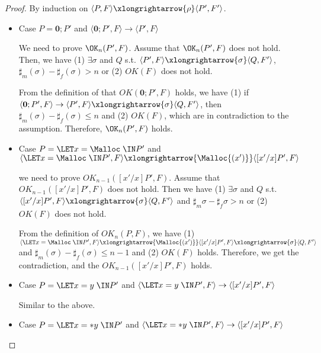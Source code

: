 \begin{proof}
By induction on \(\langle P, F \rangle \xlongrightarrow{\rho} \langle P', F' \rangle \).

\begin{itemize}

\item Case \(P = \mathbf{0};P'\) and \( \langle \mathbf{0};P', F \rangle \rightarrow \langle P', F \rangle\)

  We need to prove \(\OK_n(P', F)\).  Assume that \(\OK_n(P', F)\)
  does not hold. Then, we have (1) \( \exists \sigma \) and \(Q\) s.t. \(
  \langle P', F \rangle \xlongrightarrow{\sigma} \langle Q, F' \rangle
  \), \(\sharp_{m}(\sigma) - \sharp_{f}(\sigma) > n\) or (2) \(
  OK(F)\) does not hold.

  From the definition of that \(OK(\mathbf{0};P', F)\) holds, we have (1)
  if \( \langle \mathbf{0};P', F \rangle \rightarrow \langle P', F
  \rangle \xlongrightarrow{\sigma} \langle Q, F' \rangle \), then
  \(\sharp_m(\sigma) - \sharp_f(\sigma) \le n \) and (2) \(OK(F)\),
  which are in contradiction to the assumption. Therefore, \(\OK_n(P',
  F)\) holds.

\item Case \(P = \LET x = \Malloc \; \IN P'\) and \( \langle \LET x =
  \Malloc \; \IN P', F \rangle \xlongrightarrow{\Malloc{(x')}} \langle
          [x'/x]P', F \rangle\)

  we need to prove \(OK_{n-1}([x'/x]P', F)\). Assume that
  \(OK_{n-1}([x'/x]P', F)\) does not hold. Then we have (1) \(\exists
  \sigma\) and \(Q\) s.t. \( \langle [x'/x]P', F\rangle \xlongrightarrow{\sigma} \langle Q, F' \rangle\) and \(\sharp_m{\sigma} - \sharp_f{\sigma} > n \) or (2) \(OK(F)\) does not hold.

  From the definition of \(OK_n(P, F)\), we have (1) \( \langle \LET x
  = \Malloc \; \IN P', F \rangle \xlongrightarrow{\Malloc{(x')}}
  \langle [x'/x]P', F \rangle \xlongrightarrow{\sigma} \langle Q, F'
  \rangle\) and \(\sharp_m(\sigma) - \sharp_f(\sigma) \le n - 1 \) and
  (2) \(OK(F)\) holds. Therefore, we get the contradiction, and the
  \(OK_{n-1}([x'/x]P', F)\) holds.

\item Case \(P = \LET x = y \; \IN P'\) and \( \langle \LET x = y \;
  \IN P', F \rangle \rightarrow \langle [x'/x]P', F \rangle\)

  Similar to the above.
  
\item Case \(P = \LET x = *y \; \IN P'\) and \( \langle \LET x = *y \;
  \IN P', F \rangle \rightarrow \langle [x'/x]P', F \rangle\)


\end{itemize}
\end{proof}
